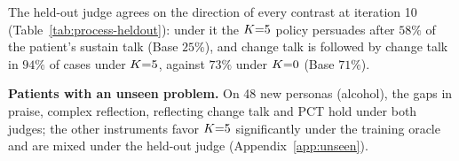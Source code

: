 The held-out judge agrees on the direction of every contrast at iteration 10
(Table~\ref{tab:process-heldout}): under it the $K{=}5$ policy persuades after $58\%$ of the patient's
sustain talk (Base $25\%$), and change talk is followed by change talk in $94\%$ of cases under
$K{=}5$, against $73\%$ under $K{=}0$ (Base $71\%$).

\textbf{Patients with an unseen problem.} On 48 new personas (alcohol), the gaps in praise, complex
reflection, reflecting change talk and PCT hold under both judges; the other instruments favor $K{=}5$
significantly under the training oracle and are mixed under the held-out judge
(Appendix~\ref{app:unseen}).
